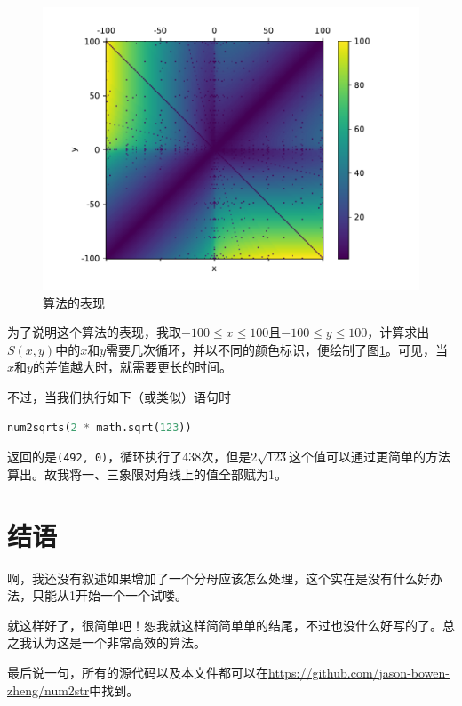 \documentclass[a4paper, UTF8]{ctexart}
\begin{document}
\begin{figure}[htb]
	\centering
	\includegraphics[width=0.8\linewidth]{perform.pdf}
	\caption{算法的表现}
	\label{fig:perform}
\end{figure}

为了说明这个算法的表现，我取$-100\leq x\leq100$且$-100\leq y\leq100$，计算求出$S(x,y)$中的$x$和$y$需要几次循环，并以不同的颜色标识，便绘制了图\ref{fig:perform}。可见，当$x$和$y$的差值越大时，就需要更长的时间。

不过，当我们执行如下（或类似）语句时
\begin{lstlisting}[language=python]
num2sqrts(2 * math.sqrt(123))
\end{lstlisting}
返回的是\verb|(492, 0)|，循环执行了438次，但是$2\sqrt{123}$这个值可以通过更简单的方法算出。故我将一、三象限对角线上的值全部赋为1。

\section{结语}
啊，我还没有叙述如果增加了一个分母应该怎么处理，这个实在是没有什么好办法，只能从1开始一个一个试喽。

就这样好了，很简单吧！恕我就这样简简单单的结尾，不过也没什么好写的了。总之我认为这是一个非常高效的算法。

最后说一句，所有的源代码以及本文件都可以在\url{https://github.com/jason-bowen-zheng/num2str}中找到。
\end{document}
